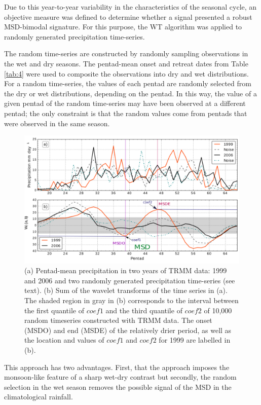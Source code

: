 Due to this year-to-year variability in the characteristics of the seasonal cycle, an objective measure was defined to determine whether a signal presented a robust MSD-bimodal signature.  
For this purpose, the WT algorithm was applied to randomly generated precipitation time-series.

 The random time-series are constructed by randomly sampling observations in the wet and dry seasons. 
 The pentad-mean onset and retreat dates from Table \ref{tab:4} were used to composite the observations into dry and wet distributions. 
 For a random time-series, the values of each pentad are randomly selected from the dry or wet distributions, depending on the pentad. In this way, the value of a given pentad of the random time-series may have been observed at a different pentad; the only constraint is that the random values come from pentads that were observed in the same season. 
 
\begin{figure}[t!]
\centering
\includegraphics[width=\linewidth]{figures/wav_S1.pdf}
\caption[Determination of MSD timings and coefficients]{(a) Pentad-mean precipitation in two years of TRMM data: 1999 and 2006 and two randomly generated precipitation time-series (see text). (b) Sum of the wavelet transforms of the time series in (a). The shaded region in gray in (b) corresponds to the interval between the first quantile of $coef1$ and the third quantile of $coef2$ of 10,000 random timeseries constructed with TRMM data. The onset (MSDO) and end (MSDE) of the relatively drier period, as well as the location and values of $coef1$ and $coef2$ for 1999 are labelled in (b). }
\label{fig:S1}
\end{figure}
 
 
 This approach has two advantages. First, that the approach imposes the monsoon-like feature of a sharp wet-dry contrast but secondly, the random selection in the wet season removes the possible signal of the MSD in the climatological rainfall.
 
